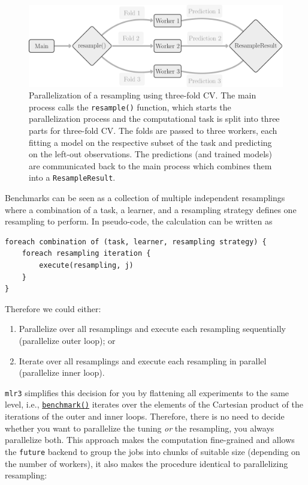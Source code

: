 \begin{figure}

{\centering \includegraphics[width=1\textwidth,height=\textheight]{chapters/chapter10/Figures/mlr3book_figures-30.png}

}

\caption{\label{fig-parallel-overview}Parallelization of a resampling
using three-fold CV. The main process calls the \texttt{resample()}
function, which starts the parallelization process and the computational
task is split into three parts for three-fold CV. The folds are passed
to three workers, each fitting a model on the respective subset of the
task and predicting on the left-out observations. The predictions (and
trained models) are communicated back to the main process which combines
them into a \texttt{ResampleResult}.}

\end{figure}

Benchmarks can be seen as a collection of
multiple independent resamplings where a combination of a task, a
learner, and a resampling strategy defines one resampling to perform. In
pseudo-code, the calculation can be written as

\begin{verbatim}
foreach combination of (task, learner, resampling strategy) {
    foreach resampling iteration {
        execute(resampling, j)
    }
}
\end{verbatim}

Therefore we could either:

\begin{enumerate}
\def\labelenumi{\arabic{enumi}.}
\tightlist
\item
  Parallelize over all resamplings and execute each resampling
  sequentially (parallelize outer loop); or
\item
  Iterate over all resamplings and execute each resampling in parallel
  (parallelize inner loop).
\end{enumerate}

\texttt{mlr3} simplifies this decision for you by flattening all
experiments to the same level, i.e.,
\href{https://mlr3.mlr-org.com/reference/benchmark.html}{\texttt{benchmark()}}
iterates over the elements of the Cartesian product of the iterations of
the outer and inner loops. Therefore, there is no need to decide whether
you want to parallelize the tuning \emph{or} the resampling, you always
parallelize both. This approach makes the computation fine-grained and
allows the \texttt{future} backend to group the jobs into chunks of
suitable size (depending on the number of workers), it also makes the
procedure identical to parallelizing resampling:

